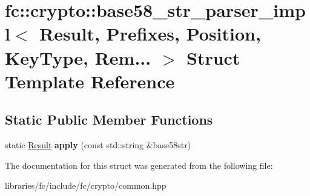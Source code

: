 \hypertarget{structfc_1_1crypto_1_1base58__str__parser__impl_3_01_result_00_01_prefixes_00_01_position_00_01_key_type_00_01_rem_8_8_8_01_4}{}\section{fc\+:\+:crypto\+:\+:base58\+\_\+str\+\_\+parser\+\_\+impl$<$ Result, Prefixes, Position, Key\+Type, Rem... $>$ Struct Template Reference}
\label{structfc_1_1crypto_1_1base58__str__parser__impl_3_01_result_00_01_prefixes_00_01_position_00_01_key_type_00_01_rem_8_8_8_01_4}
\subsection*{Static Public Member Functions}
\begin{DoxyCompactItemize}
\item 
\mbox{\label{structfc_1_1crypto_1_1base58__str__parser__impl_3_01_result_00_01_prefixes_00_01_position_00_01_key_type_00_01_rem_8_8_8_01_4_af6c7086acfcd4d0bb6aab16b3951b473}} 
static \mbox{\hyperlink{struct_result}{Result}} {\bfseries apply} (const std\+::string \&base58str)
\end{DoxyCompactItemize}


The documentation for this struct was generated from the following file\+:\begin{DoxyCompactItemize}
\item 
libraries/fc/include/fc/crypto/common.\+hpp\end{DoxyCompactItemize}
